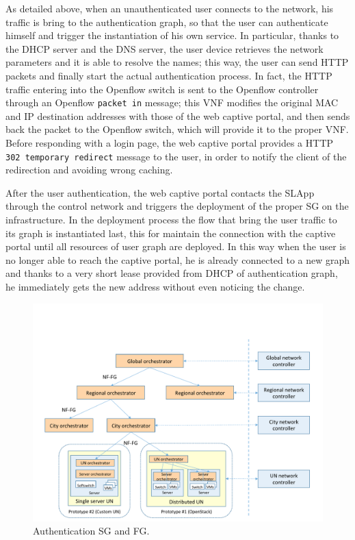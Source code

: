 As detailed above, when an unauthenticated user connects to the network, his traffic is bring to the authentication graph, so that the user can authenticate himself and trigger the instantiation of his own service.
In particular, thanks to the DHCP server and the DNS server, 
%
the user device retrieves the network parameters and it is able to resolve the names; this way, the user can send HTTP packets and finally start the actual authentication process.
In fact, the HTTP traffic entering into the Openflow switch is sent to the Openflow controller through an Openflow \texttt{packet in} message; this VNF modifies the original MAC and IP destination addresses %
with those of the web captive portal, and then sends back the packet to the Openflow switch, which will provide it to the proper VNF. 
Before responding with a login page, the web captive portal provides a HTTP \texttt{302 temporary redirect} message to the user, in order to notify the client of the redirection and avoiding wrong caching. 

After the user authentication, the web captive portal contacts the SLApp through the control network and triggers the deployment of the proper SG on the infrastructure. In the deployment process the flow that bring the user traffic to its graph is instantiated last, this for maintain the connection with the captive portal until all resources of user graph are deployed. In this way when the user is no longer able to reach the captive portal, he is already connected to a new graph and thanks to a very short lease provided from DHCP of authentication graph, he immediately gets the new address without even noticing the change.

\begin{figure} %
	\centering
	\includegraphics[clip= true, width= 1\columnwidth, trim= 0.0cm 12cm 0.3cm 1.1cm, page= 36]{images/Pictures_definitivo.pdf}
	\caption{Authentication SG and FG.}
	\label{fig:auth_graph}
\end{figure}

